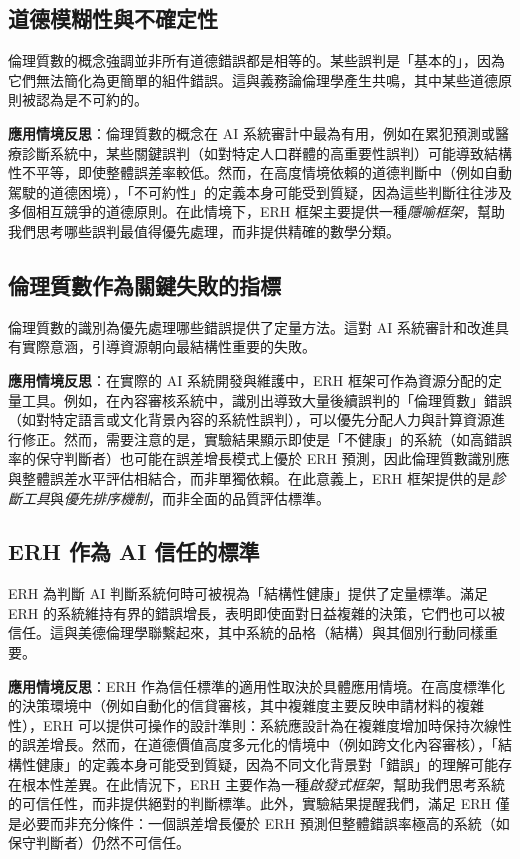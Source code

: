 \documentclass[12pt,a4paper]{article}
\theoremstyle{definition}
\theoremstyle{remark}
\begin{document}
\subsection{道德模糊性與不確定性}

倫理質數的概念強調並非所有道德錯誤都是相等的。某些誤判是「基本的」，因為它們無法簡化為更簡單的組件錯誤。這與義務論倫理學產生共鳴，其中某些道德原則被認為是不可約的。

\textbf{應用情境反思}：倫理質數的概念在 AI 系統審計中最為有用，例如在累犯預測或醫療診斷系統中，某些關鍵誤判（如對特定人口群體的高重要性誤判）可能導致結構性不平等，即使整體誤差率較低。然而，在高度情境依賴的道德判斷中（例如自動駕駛的道德困境），「不可約性」的定義本身可能受到質疑，因為這些判斷往往涉及多個相互競爭的道德原則。在此情境下，ERH 框架主要提供一種\emph{隱喻框架}，幫助我們思考哪些誤判最值得優先處理，而非提供精確的數學分類。

\subsection{倫理質數作為關鍵失敗的指標}

倫理質數的識別為優先處理哪些錯誤提供了定量方法。這對 AI 系統審計和改進具有實際意涵，引導資源朝向最結構性重要的失敗。

\textbf{應用情境反思}：在實際的 AI 系統開發與維護中，ERH 框架可作為資源分配的定量工具。例如，在內容審核系統中，識別出導致大量後續誤判的「倫理質數」錯誤（如對特定語言或文化背景內容的系統性誤判），可以優先分配人力與計算資源進行修正。然而，需要注意的是，實驗結果顯示即使是「不健康」的系統（如高錯誤率的保守判斷者）也可能在誤差增長模式上優於 ERH 預測，因此倫理質數識別應與整體誤差水平評估相結合，而非單獨依賴。在此意義上，ERH 框架提供的是\emph{診斷工具}與\emph{優先排序機制}，而非全面的品質評估標準。

\subsection{ERH 作為 AI 信任的標準}

ERH 為判斷 AI 判斷系統何時可被視為「結構性健康」提供了定量標準。滿足 ERH 的系統維持有界的錯誤增長，表明即使面對日益複雜的決策，它們也可以被信任。這與美德倫理學聯繫起來，其中系統的品格（結構）與其個別行動同樣重要。

\textbf{應用情境反思}：ERH 作為信任標準的適用性取決於具體應用情境。在高度標準化的決策環境中（例如自動化的信貸審核，其中複雜度主要反映申請材料的複雜性），ERH 可以提供可操作的設計準則：系統應設計為在複雜度增加時保持次線性的誤差增長。然而，在道德價值高度多元化的情境中（例如跨文化內容審核），「結構性健康」的定義本身可能受到質疑，因為不同文化背景對「錯誤」的理解可能存在根本性差異。在此情況下，ERH 主要作為一種\emph{啟發式框架}，幫助我們思考系統的可信任性，而非提供絕對的判斷標準。此外，實驗結果提醒我們，滿足 ERH 僅是必要而非充分條件：一個誤差增長優於 ERH 預測但整體錯誤率極高的系統（如保守判斷者）仍然不可信任。
\end{document}
